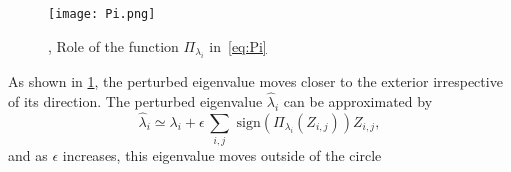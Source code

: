 \begin{figure}[H]
  \centering
  \texttt{[image: Pi.png]}
  \caption{\cite{10383531}, Role of the function $\Pi_{\lambda_i}$ in~\eqref{eq:Pi}
  }
  \label{fig:Pi}
\end{figure}
As shown in \ref{fig:Pi}, the perturbed eigenvalue moves closer to the exterior irrespective of its direction.
The perturbed eigenvalue $\hat{\lambda}_i$ can be approximated by 
\[
 \textstyle{\hat{\lambda}_i\simeq\lambda_i+\epsilon\,\sum_{i,j}\text{ sign}(\Pi_{\lambda_i}(Z_{i,j}))Z_{i,j},}
\]
and as $\epsilon$ increases, this eigenvalue moves outside of the circle

